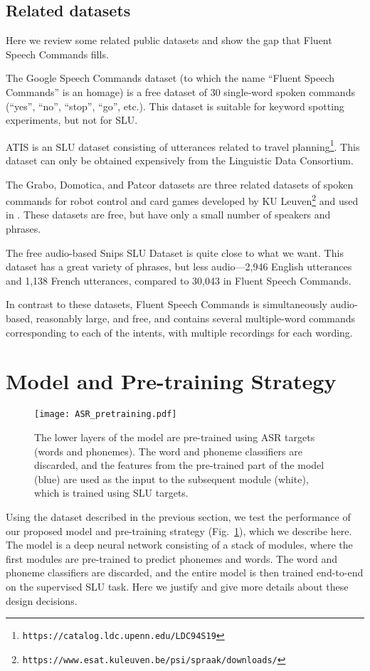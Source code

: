 \documentclass[a4paper]{article}
\begin{document}
\subsection{Related datasets}
Here we review some related public datasets and show the gap that Fluent Speech Commands fills.

The Google Speech Commands dataset \cite{Warden2018} (to which the name ``Fluent Speech Commands'' is an homage) is a free dataset of 30 single-word spoken commands (``yes'', ``no'', ``stop'', ``go'', etc.). This dataset is suitable for keyword spotting experiments, but not for SLU.

ATIS is an SLU dataset consisting of utterances related to travel planning\footnote{\texttt{https://catalog.ldc.upenn.edu/LDC94S19}}. This dataset can only be obtained expensively from the Linguistic Data Consortium.

The Grabo, Domotica, and Patcor datasets are three related datasets of spoken commands for robot control and card games developed by KU Leuven\footnote{\texttt{https://www.esat.kuleuven.be/psi/spraak/downloads/}} and used in \cite{Renkens2018}. These datasets are free, but have only a small number of speakers and phrases.

The free audio-based Snips SLU Dataset \cite{Saade} is quite close to what we want. This dataset has a great variety of phrases, but less audio---2,946 English utterances and 1,138 French utterances, compared to 30,043 in Fluent Speech Commands.



In contrast to these datasets, Fluent Speech Commands is simultaneously audio-based, reasonably large, and free, and contains several multiple-word commands corresponding to each of the intents, with multiple recordings for each wording.

\section{Model and Pre-training Strategy}
\begin{figure}
    \centering
    \texttt{[image: ASR\_pretraining.pdf]}
    \caption{The lower layers of the model are pre-trained using ASR targets (words and phonemes). The word and phoneme classifiers are discarded, and the features from the pre-trained part of the model (blue) are used as the input to the subsequent module (white), which is trained using SLU targets.}
    \label{fig:SLU}
\end{figure}
Using the dataset described in the previous section, we test the performance of our proposed model and pre-training strategy (Fig.\ \ref{fig:SLU}), which we describe here.
The model is a deep neural network consisting of a stack of modules, where the first modules are pre-trained to predict phonemes and words. The word and phoneme classifiers are discarded, and the entire model is then trained end-to-end on the supervised SLU task.
Here we justify and give more details about these design decisions.
\end{document}
